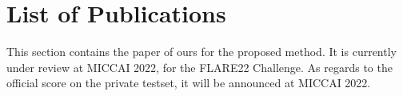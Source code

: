 \chapter*{List of Publications}

This section contains the paper of ours for the proposed method. It is currently under review at MICCAI 2022, for the FLARE22 Challenge. As regards to the official score on the private testset, it will be announced at MICCAI 2022.

